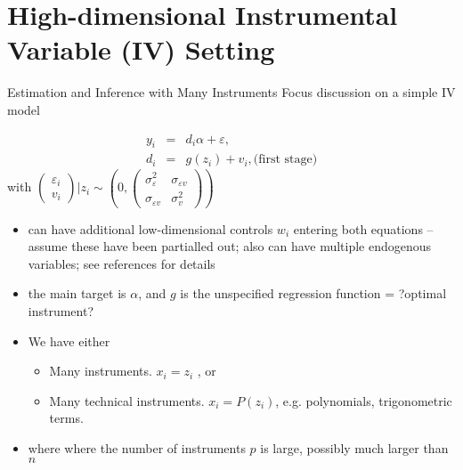 \documentclass{beamer}
\begin{document}
\section{High-dimensional Instrumental Variable (IV) Setting}

\begin{frame}{Estimation and Inference with Many Instruments}
Focus discussion on a simple IV model

\begin{eqnarray}
y_i &=& d_i \alpha + \varepsilon,\\
d_i &=& g(z_i) + v_i, \mbox{(first stage)}
\label{eq:}
\end{eqnarray}
with $\begin{pmatrix} \varepsilon_i \\ v_i \end{pmatrix} | z_i \sim \left( 0, \begin{pmatrix}
	\sigma^2_{\varepsilon} & \sigma_{\varepsilon v} \\ \sigma_{\varepsilon v} &	\sigma^2_{v}
\end{pmatrix}\right)$
\end{frame}

\begin{frame}
	\begin{itemize}
		\item can have additional low-dimensional controls $w_i$ entering both
equations -- assume these have been partialled out; also can
have multiple endogenous variables; see references for details
\item the main target is $\alpha$, and $g$ is the unspecified regression function
= ?optimal instrument?
\item We have either
\begin{itemize}
	\item  Many instruments. $x_i = z_i$ , or
	\item Many technical instruments. $x_i = P(z_i)$, e.g. polynomials,
trigonometric terms.
\end{itemize} 
\item where where the number of instruments $p$ is large, possibly much larger than $n$
\end{itemize}
\end{frame}
\end{document}
